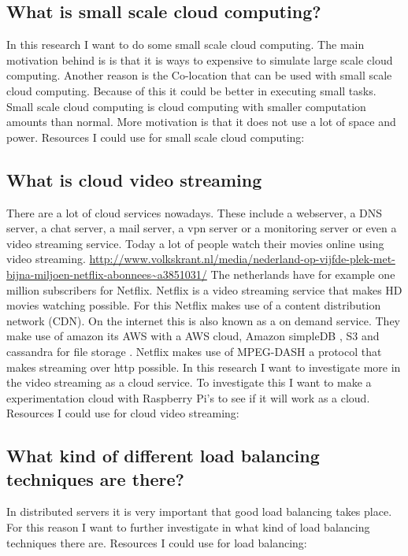 \documentclass{sig-alternate-br}
\begin{document}
\subsection{What is small scale cloud computing?}
In this research I want to do some small scale cloud computing. The main motivation behind is is that it is ways to expensive to simulate large scale cloud computing. Another reason is the Co-location that can be used with small scale cloud computing. Because of this it could be better in executing small tasks. Small scale cloud computing is cloud computing with smaller computation amounts than normal. More motivation is that it does not use a lot of space and power. 
Resources I could use for small scale cloud computing:

 


\subsection{What is cloud video streaming}
There are a lot of cloud services nowadays. These include a webserver, a DNS server, a chat server, a mail server, a vpn server or a monitoring server or even a video streaming service. 
Today a lot of people watch their movies online using video streaming. \url{http://www.volkskrant.nl/media/nederland-op-vijfde-plek-met-bijna-miljoen-netflix-abonnees~a3851031/} The netherlands have for example one million subscribers for Netflix. Netflix is a video streaming service that makes HD movies watching possible. For this Netflix makes use of a content distribution network (CDN). On the internet this is also known as a on demand service. They make use of amazon its AWS with a AWS cloud, Amazon simpleDB , S3 and cassandra for file storage \cite{Adhikari:2012}. Netflix makes use of MPEG-DASH a protocol that makes streaming over http possible. In this research I want to investigate more in the video streaming as a cloud service. 
To investigate this I want to make a experimentation cloud with Raspberry Pi's to see if it will work as a cloud. 
Resources I could use for cloud video streaming:
 
\subsection{What kind of different load balancing techniques are there?}
In distributed servers it is very important that good load balancing takes place. For this reason I want to further investigate in what kind of load balancing techniques there are. 
Resources I could use for load balancing:
 
\end{document}
